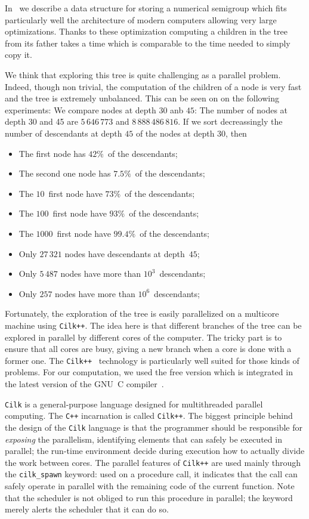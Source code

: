 \documentclass{deliverablereport}
\newcommand{\Cilk}{\texttt{Cilk}\xspace}
\newcommand{\CilkP}{\texttt{Cilk++}\xspace}
\newcommand{\CPP}{\texttt{C++}\xspace}
\begin{document}
In~\cite{FromentinH16} we describe a data structure for storing a numerical
semigroup which fits particularly well the architecture of modern computers
allowing very large optimizations. Thanks to these optimization computing a
children in the tree from its father takes a time which is comparable to the
time needed to simply copy it.

We think that exploring this tree is quite challenging as a parallel problem.
Indeed, though non trivial, the computation of the children of a node is very
fast and the tree is extremely unbalanced. This can be seen on
on the following experiments: We compare nodes at depth
$30$ anb $45$: The number of nodes at depth 30 and 45 are $5\,646\,773$ and
$8\,888\,486\,816$. If we sort decreassingly the number of descendants at depth
$45$ of the nodes at depth $30$, then
\begin{itemize}
\item The first node has $42\%$~of the descendants;
\item The second one node has $7.5\%$~of the descendants;
\item The $10$~first node have $73\%$~of the descendants;
\item The $100$~first node have $93\%$~of the descendants;
\item The $1000$~first node have $99.4\%$~of the descendants;
\item Only $27\,321$ nodes have descendants at depth~$45$;
\item Only $5\,487$ nodes have more than $10^3$~descendants;
\item Only $257$ nodes have more than $10^6$~descendants;
\end{itemize}
\medskip

Fortunately, the exploration of the tree is easily parallelized on a multicore
machine using \CilkP. The idea here is that different branches of the tree
can be explored in parallel by different cores of the computer. The tricky
part is to ensure that all cores are busy, giving a new branch when a core is
done with a former one. The \CilkP~\cite{CilkIntel} technology is
particularly well suited for those kinds of problems. For our computation, we
used the free version which is integrated in the latest version of the GNU~C
compiler~\cite{GCCcilk}.

\Cilk is a general-purpose language designed for multithreaded parallel
computing. The \CPP incarnation is called \CilkP. The biggest principle behind
the design of the \Cilk language is that the programmer should be responsible
for \emph{exposing} the parallelism, identifying elements that can safely be
executed in parallel; the run-time environment decide during execution how to
actually divide the work between cores. The parallel features of \CilkP are
used mainly through the \texttt{cilk\_spawn} keyword: used on a procedure
call, it indicates that the call can safely operate in parallel with the
remaining code of the current function. Note that the scheduler is not obliged
to run this procedure in parallel; the keyword merely alerts the scheduler
that it can do so.
\end{document}
